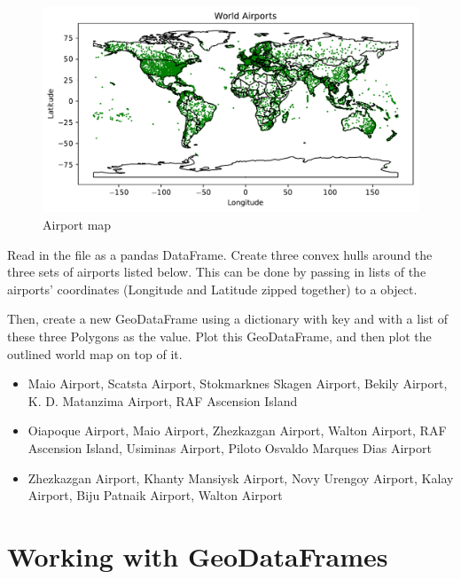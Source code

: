 \begin{figure}[H]
\begin{center}
\includegraphics[scale=.7]{figures/airports.pdf}
\end{center}
\label{airport-map}
\caption{Airport map}
\end{figure}

\begin{problem}
Read in the file  as a pandas DataFrame.
Create three convex hulls around the three sets of airports listed below.
This can be done by passing in lists of the airports' coordinates (Longitude and Latitude zipped together) to a  object.

Then, create a new GeoDataFrame using a dictionary with key  and with a list of these three Polygons as the value.
Plot this GeoDataFrame, and then plot the outlined world map on top of it.

\begin{itemize} %
	\item Maio Airport, Scatsta Airport, Stokmarknes Skagen Airport, Bekily Airport, K. D. Matanzima Airport, RAF Ascension Island
	\item Oiapoque Airport, Maio Airport, Zhezkazgan Airport, Walton Airport, RAF Ascension Island, Usiminas Airport, Piloto Osvaldo Marques Dias Airport
	\item Zhezkazgan Airport, Khanty Mansiysk Airport, Novy Urengoy Airport, Kalay Airport, Biju Patnaik Airport, Walton Airport
\end{itemize}
\end{problem}

\section*{Working with GeoDataFrames} %

